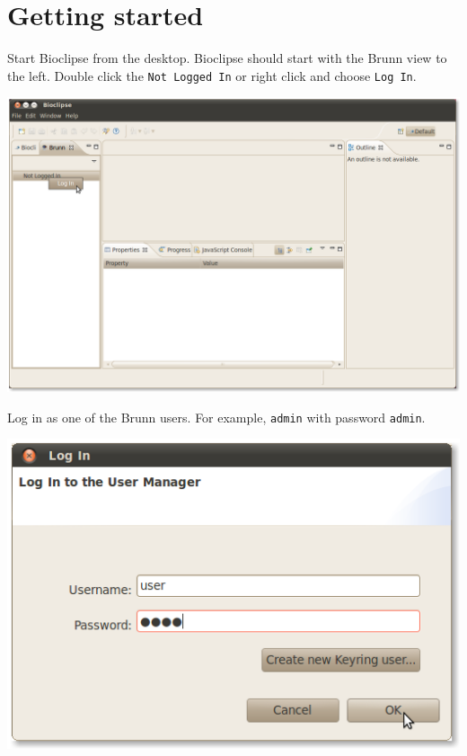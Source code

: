 \documentclass[12pt, a4paper, twoside, openany]{article}
\begin{document}
    \newpage

    \section*{Getting started}
    Start Bioclipse from the desktop. Bioclipse should start with the Brunn
    view to the left. Double click the \texttt{Not Logged In} or right click
    and choose \texttt{Log In}.

    \begin{center}
        \includegraphics[scale=1.2]{images/1.png}
    \end{center}

    Log in as one of the Brunn users. For example, \texttt{admin} with password
    \texttt{admin}.

    \begin{center}
        \includegraphics[scale=1.2]{images/2.png}
    \end{center}
\end{document}
